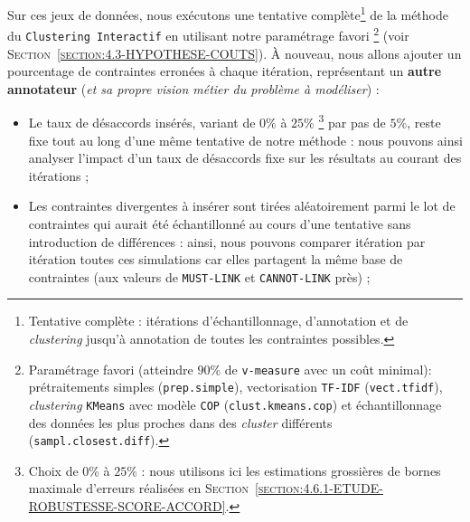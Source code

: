 			Sur ces jeux de données, nous exécutons une tentative complète\footnote{
				Tentative complète : itérations d'échantillonnage, d'annotation et de \textit{clustering} jusqu'à annotation de toutes les contraintes possibles.
			}
			de la méthode du \texttt{Clustering Interactif} en utilisant notre paramétrage favori \footnote{
				Paramétrage favori (atteindre $90$\% de \texttt{v-measure} avec un coût minimal): prétraitements simples (\texttt{prep.simple}), vectorisation \texttt{TF-IDF} (\texttt{vect.tfidf}), \textit{clustering} \texttt{KMeans} avec modèle \texttt{COP} (\texttt{clust.kmeans.cop}) et échantillonnage des données les plus proches dans des \textit{cluster} différents (\texttt{sampl.closest.diff}).
			} (voir \textsc{Section~\ref{section:4.3-HYPOTHESE-COUTS}}).
			À nouveau, nous allons ajouter un pourcentage de contraintes erronées à chaque itération, représentant un \textbf{autre annotateur} (\textit{et sa propre vision métier du problème à modéliser}) :
			\begin{itemize}
				\item Le taux de désaccords insérés, variant de $0$\% à $25$\% \footnote{
					Choix de $0$\% à $25$\% : nous utilisons ici les estimations grossières de bornes maximale d'erreurs réalisées en \textsc{Section~\ref{section:4.6.1-ETUDE-ROBUSTESSE-SCORE-ACCORD}}.
				} par pas de $5$\%, reste fixe tout au long d'une même tentative de notre méthode : nous pouvons ainsi analyser l'impact d'un taux de désaccords fixe sur les résultats au courant des itérations ;
				\item Les contraintes divergentes à insérer sont tirées aléatoirement parmi le lot de contraintes qui aurait été échantillonné au cours d'une tentative sans introduction de différences : ainsi, nous pouvons comparer itération par itération toutes ces simulations car elles partagent la même base de contraintes (aux valeurs de \texttt{MUST-LINK} et \texttt{CANNOT-LINK} près) ;
			\end{itemize}
			
